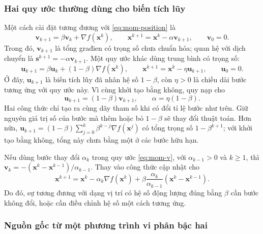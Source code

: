 \subsubsection{Hai quy ước thường dùng cho biến tích lũy}

Một cách cài đặt tương đương với \eqref{eq:mom-position} là
\begin{equation}
 \mathbf{v}_{k+1}=\beta\mathbf{v}_k+\nabla f(\mathbf{x}^{k}),
 \qquad \mathbf{x}^{k+1}=\mathbf{x}^{k}-\alpha\mathbf{v}_{k+1},
 \qquad \mathbf{v}_0=0.
 \label{eq:mom-v}
\end{equation}
Trong đó, $\mathbf{v}_{k+1}$ là tổng građien có trọng số chưa chuẩn hóa;
quan hệ với dịch chuyển là $\mathbf{s}^{k+1}=-\alpha\mathbf{v}_{k+1}$.
Một quy ước khác dùng trung bình có trọng số:
\begin{equation}
 \mathbf{u}_{k+1}=\beta\mathbf{u}_k+(1-\beta)\nabla f(\mathbf{x}^{k}),
 \qquad \mathbf{x}^{k+1}=\mathbf{x}^{k}-\eta\mathbf{u}_{k+1},
 \qquad \mathbf{u}_0=0.
 \label{eq:mom-u}
\end{equation}
Ở đây, $\mathbf{u}_{k+1}$ là biến tích lũy đã nhân hệ số $1-\beta$,
còn $\eta>0$ là chiều dài bước tương ứng với quy ước này.
Vì cùng khởi tạo bằng không, quy nạp cho
\begin{equation}
 \mathbf{u}_{k+1}=(1-\beta)\mathbf{v}_{k+1},\qquad
 \alpha=\eta(1-\beta).
 \label{eq:mom-rescale}
\end{equation}
Hai công thức chỉ tạo ra cùng dãy tham số khi có đổi tỉ lệ bước như trên.
Giữ nguyên giá trị số của bước mà thêm hoặc bỏ $1-\beta$ sẽ thay đổi
thuật toán. Hơn nữa,
$\mathbf{u}_{k+1}=(1-\beta)\sum_{j=0}^{k}\beta^{k-j}
\nabla f(\mathbf{x}^{j})$ có tổng trọng số $1-\beta^{k+1}$;
với khởi tạo bằng không, tổng này chưa bằng một ở các bước hữu hạn.

Nếu dùng bước thay đổi $\alpha_k$ trong quy ước \eqref{eq:mom-v},
với $\alpha_{k-1}>0$ và $k\geq1$, thì
$\mathbf{v}_k=-(\mathbf{x}^{k}-\mathbf{x}^{k-1})/\alpha_{k-1}$.
Thay vào công thức cập nhật cho
\begin{equation}
 \mathbf{x}^{k+1}=\mathbf{x}^{k}-\alpha_k\nabla f(\mathbf{x}^{k})
 +\beta\frac{\alpha_k}{\alpha_{k-1}}
            (\mathbf{x}^{k}-\mathbf{x}^{k-1}).
 \label{eq:mom-variable-step}
\end{equation}
Do đó, sự tương đương với dạng vị trí có hệ số động lượng đúng bằng
$\beta$ cần bước không đổi, hoặc cần điều chỉnh hệ số một cách tương ứng.

\subsubsection{Nguồn gốc từ một phương trình vi phân bậc hai}

